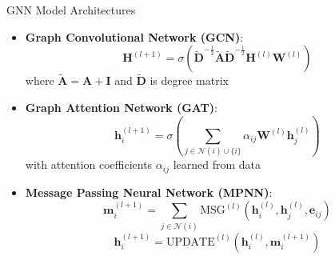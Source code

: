 \documentclass{beamer}
\begin{document}
\begin{frame}{GNN Model Architectures}
\begin{itemize}
    \item \textbf{Graph Convolutional Network (GCN)}:
    \begin{equation}
    \mathbf{H}^{(l+1)} = \sigma\left(\tilde{\mathbf{D}}^{-\frac{1}{2}}\tilde{\mathbf{A}}\tilde{\mathbf{D}}^{-\frac{1}{2}}\mathbf{H}^{(l)}\mathbf{W}^{(l)}\right)
    \end{equation}
    where $\tilde{\mathbf{A}} = \mathbf{A} + \mathbf{I}$ and $\tilde{\mathbf{D}}$ is degree matrix
    
    \item \textbf{Graph Attention Network (GAT)}:
    \begin{equation}
    \mathbf{h}_i^{(l+1)} = \sigma\left(\sum_{j \in \mathcal{N}(i) \cup \{i\}} \alpha_{ij} \mathbf{W}^{(l)}\mathbf{h}_j^{(l)}\right)
    \end{equation}
    with attention coefficients $\alpha_{ij}$ learned from data
    
    \item \textbf{Message Passing Neural Network (MPNN)}:
    \begin{equation}
    \mathbf{m}_{i}^{(l+1)} = \sum_{j \in \mathcal{N}(i)} \text{MSG}^{(l)}(\mathbf{h}_i^{(l)}, \mathbf{h}_j^{(l)}, \mathbf{e}_{ij})
    \end{equation}
    \begin{equation}
    \mathbf{h}_i^{(l+1)} = \text{UPDATE}^{(l)}(\mathbf{h}_i^{(l)}, \mathbf{m}_i^{(l+1)})
    \end{equation}
\end{itemize}
\end{frame}
\end{document}
